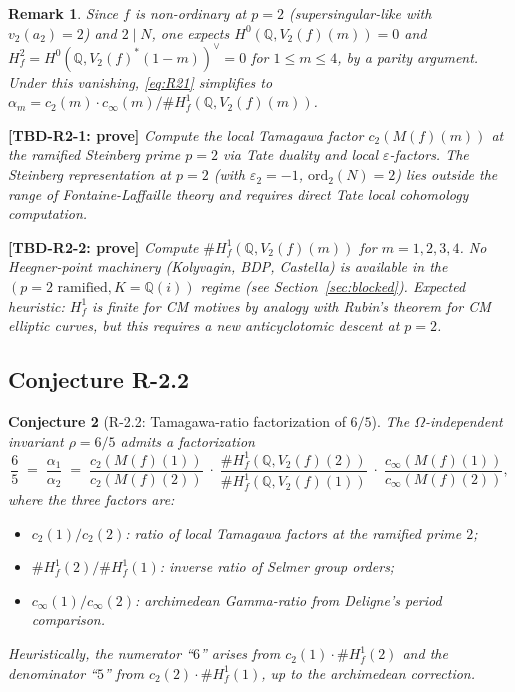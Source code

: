 \documentclass[12pt]{amsart}
\newtheorem{conjecture}{Conjecture}[section]
\newtheorem{remark}[conjecture]{Remark}
\theoremstyle{definition}
\newcommand{\Q}{\mathbb{Q}}
\newcommand{\ord}{\mathrm{ord}}
\newcommand{\tbdtag}[2]{\textbf{[TBD-R2-#1: prove]} \emph{#2}}
\begin{document}
\begin{remark}
Since $f$ is non-ordinary at $p = 2$ (supersingular-like with $v_2(a_2) = 2$)
and $2 \mid N$, one expects $H^0(\Q, V_2(f)(m)) = 0$ and $H^2_f = H^0(\Q, V_2(f)^*(1-m))^\vee = 0$
for $1 \leq m \leq 4$, by a parity argument. Under this vanishing,
\eqref{eq:R21} simplifies to $\alpha_m = c_2(m) \cdot c_\infty(m) / \#H^1_f(\Q, V_2(f)(m))$.
\end{remark}

\tbdtag{1}{Compute the local Tamagawa factor $c_2(M(f)(m))$
at the ramified Steinberg prime $p = 2$ via Tate duality
and local $\varepsilon$-factors. The Steinberg representation
at $p = 2$ (with $\varepsilon_2 = -1$, $\ord_2(N) = 2$) lies
outside the range of Fontaine-Laffaille theory and requires
direct Tate local cohomology computation.}

\tbdtag{2}{Compute $\#H^1_f(\Q, V_2(f)(m))$ for $m = 1, 2, 3, 4$.
No Heegner-point machinery (Kolyvagin, BDP, Castella)
is available in the $(p=2 \text{ ramified}, K=\Q(i))$ regime
(see Section~\ref{sec:blocked}).
Expected heuristic: $H^1_f$ is finite for CM motives by analogy
with Rubin's theorem \cite{Rub91} for CM elliptic curves,
but this requires a new anticyclotomic descent at $p = 2$.}

\subsection{Conjecture R-2.2}

\begin{conjecture}[R-2.2: Tamagawa-ratio factorization of $6/5$]
\label{conj:R22}
The $\Omega$-independent invariant $\rho = 6/5$ admits a factorization
\begin{equation}\label{eq:R22}
  \frac{6}{5}
  \;=\;
  \frac{\alpha_1}{\alpha_2}
  \;=\;
  \frac{c_2(M(f)(1))}{c_2(M(f)(2))}
  \;\cdot\;
  \frac{\#H^1_f(\Q, V_2(f)(2))}{\#H^1_f(\Q, V_2(f)(1))}
  \;\cdot\;
  \frac{c_\infty(M(f)(1))}{c_\infty(M(f)(2))},
\end{equation}
where the three factors are:
\begin{itemize}
  \item $c_2(1)/c_2(2)$: ratio of local Tamagawa factors at the ramified prime $2$;
  \item $\#H^1_f(2)/\#H^1_f(1)$: inverse ratio of Selmer group orders;
  \item $c_\infty(1)/c_\infty(2)$: archimedean Gamma-ratio from Deligne's period comparison.
\end{itemize}
Heuristically, the numerator ``$6$'' arises from $c_2(1) \cdot \#H^1_f(2)$
and the denominator ``$5$'' from $c_2(2) \cdot \#H^1_f(1)$,
up to the archimedean correction.
\end{conjecture}
\end{document}
